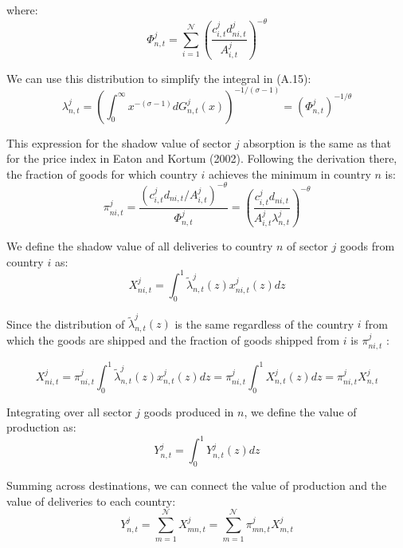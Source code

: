 \documentclass[12pt, bibtotoc, tablecaptionabove, figurecaptionabove, fleqn]{article}
\begin{document}
where:
\begin{equation*}
	\Phi_{n, t}^{j}=\sum_{i=1}^{\mathcal{N}}\left(\frac{c_{i, t}^{j} d_{n i, t}^{j}}{A_{i, t}^{j}}\right)^{-\theta}
\end{equation*}

We can use this distribution to simplify the integral in (A.15):
\begin{equation*}
	\lambda_{n, t}^{j}=\left(\int_{0}^{\infty} x^{-(\sigma-1)} d G_{n, t}^{j}(x)\right)^{-1 /(\sigma-1)}=\left(\Phi_{n, t}^{j}\right)^{-1 / \theta}
\end{equation*}

This expression for the shadow value of sector $j$ absorption is the same as that for the price index in Eaton and Kortum (2002). Following the derivation there, the fraction of goods for which country $i$ achieves the minimum in country $n$ is:
\begin{equation*}
\pi_{n i, t}^{j}=\frac{\left(c_{i, t}^{j} d_{n i, t} / A_{i, t}^{j}\right)^{-\theta}}{\Phi_{n, t}^{j}}=\left(\frac{c_{i, t}^{j} d_{n i, t}}{A_{i, t}^{j} \lambda_{n, t}^{j}}\right)^{-\theta}
\end{equation*}

We define the shadow value of all deliveries to country $n$ of sector $j$ goods from country $i$ as:
\begin{equation*}
	X_{n i, t}^{j}=\int_{0}^{1} \tilde{\lambda}_{n, t}^{j}(z) x_{n i, t}^{j}(z) d z
\end{equation*}

Since the distribution of $\tilde{\lambda}_{n, t}^{j}(z)$ is the same regardless of the country $i$ from which the goods are
shipped and the fraction of goods shipped from $i$ is $\pi_{n i, t}^{j}$ :

\begin{equation*}
	X_{n i, t}^{j}=\pi_{n i, t}^{j} \int_{0}^{1} \tilde{\lambda}_{n, t}^{j}(z) x_{n, t}^{j}(z) d z=\pi_{n i, t}^{j} \int_{0}^{1} X_{n, t}^{j}(z) d z=\pi_{n i, t}^{j} X_{n, t}^{j}
\end{equation*}

Integrating over all sector $j$ goods produced in $n$, we define the value of production as:
\begin{equation*}
	Y_{n, t}^{j}=\int_{0}^{1} Y_{n, t}^{j}(z) d z
\end{equation*}

Summing across destinations, we can connect the value of production and the value of deliveries to each country:
\begin{equation*}
	Y_{n, t}^{j}=\sum_{m=1}^{\mathcal{N}} X_{m n, t}^{j}=\sum_{m=1}^{\mathcal{N}} \pi_{m n, t}^{j} X_{m, t}^{j}
\end{equation*}
\end{document}
